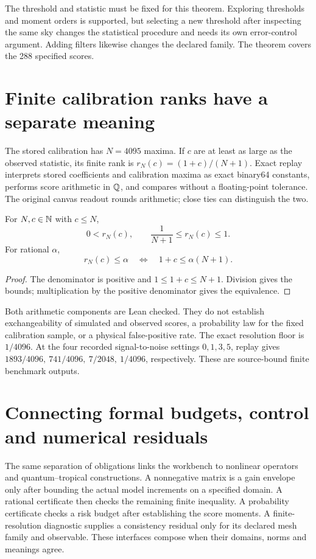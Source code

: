The threshold and statistic must be fixed for this theorem. Exploring
thresholds and moment orders is supported, but selecting a new threshold
after inspecting the same sky changes the statistical procedure and needs
its own error-control argument. Adding filters likewise changes the
declared family. The theorem covers the 288 specified scores.

\section{Finite calibration ranks have a separate meaning}

The stored calibration has \(N=4095\) maxima. If \(c\) are at least as
large as the observed statistic, its finite rank is
\(r_N(c)=(1+c)/(N+1)\). Exact replay interprets stored coefficients and
calibration maxima as exact binary64 constants, performs score arithmetic
in \(\mathbb{Q}\), and compares without a floating-point tolerance. The original
canvas readout rounds arithmetic; close ties can distinguish the two.

\begin{proposition}\label{prop:workbench-rank-arithmetic}
For \(N,c\in\mathbb{N}\) with \(c\leq N\),
\[
 0<r_N(c),\qquad \frac1{N+1}\leq r_N(c)\leq1.
\]
For rational \(\alpha\),
\[
 r_N(c)\leq\alpha
 \quad\Longleftrightarrow\quad 1+c\leq\alpha(N+1).
\]
\end{proposition}
\begin{proof}
The denominator is positive and \(1\leq1+c\leq N+1\). Division gives
the bounds; multiplication by the positive denominator gives the equivalence.
\end{proof}

Both arithmetic components are Lean checked. They do not establish
exchangeability of simulated and observed scores, a probability law for the
fixed calibration sample, or a physical false-positive rate. The exact
resolution floor is \(1/4096\). At the four recorded signal-to-noise settings
\(0,1,3,5\), replay gives \(1893/4096,\ 741/4096,\ 7/2048,\ 1/4096\),
respectively. These are source-bound finite benchmark outputs.

\section{Connecting formal budgets, control and numerical residuals}

The same separation of obligations links the workbench to nonlinear operators
and quantum--tropical constructions. A nonnegative matrix is a gain envelope
only after bounding the actual model increments on a specified domain. A
rational certificate then checks the remaining finite inequality. A
probability certificate checks a risk budget after establishing the score
moments. A finite-resolution diagnostic supplies a consistency residual only
for its declared mesh family and observable. These interfaces compose when
their domains, norms and meanings agree.

